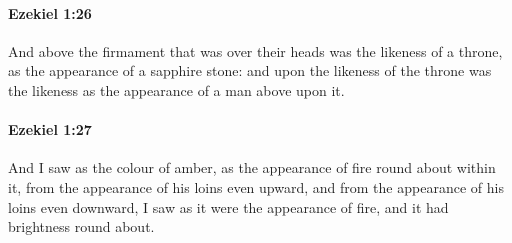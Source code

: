 		\paragraph{Ezekiel 1:26} %
			\label{EZEKIEL-1-26}

			And above the firmament that was over their heads was the likeness of a throne, as the appearance of a sapphire stone: and upon the likeness of the throne was the likeness as the appearance of a man above upon it.


		\paragraph{Ezekiel 1:27} %
			\label{EZEKIEL-1-27}

			And I saw as the colour of amber, as the appearance of fire round about within it, from the appearance of his loins even upward, and from the appearance of his loins even downward, I saw as it were the appearance of fire, and it had brightness round about.

